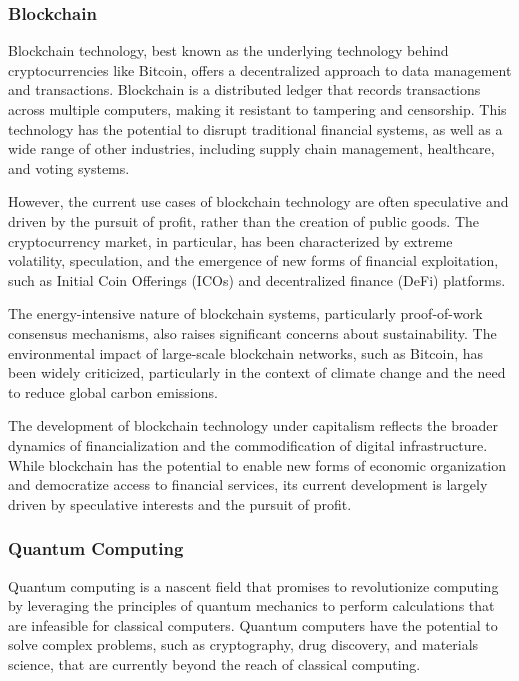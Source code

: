 \begin{refsection}
\begin{multicols}{2}
{\subsubsection{Blockchain}

Blockchain technology, best known as the underlying technology behind cryptocurrencies like Bitcoin, offers a decentralized approach to data management and transactions. Blockchain is a distributed ledger that records transactions across multiple computers, making it resistant to tampering and censorship. This technology has the potential to disrupt traditional financial systems, as well as a wide range of other industries, including supply chain management, healthcare, and voting systems.

However, the current use cases of blockchain technology are often speculative and driven by the pursuit of profit, rather than the creation of public goods. The cryptocurrency market, in particular, has been characterized by extreme volatility, speculation, and the emergence of new forms of financial exploitation, such as Initial Coin Offerings (ICOs) and decentralized finance (DeFi) platforms.

The energy-intensive nature of blockchain systems, particularly proof-of-work consensus mechanisms, also raises significant concerns about sustainability. The environmental impact of large-scale blockchain networks, such as Bitcoin, has been widely criticized, particularly in the context of climate change and the need to reduce global carbon emissions.

The development of blockchain technology under capitalism reflects the broader dynamics of financialization and the commodification of digital infrastructure. While blockchain has the potential to enable new forms of economic organization and democratize access to financial services, its current development is largely driven by speculative interests and the pursuit of profit.

\subsubsection{Quantum Computing}

Quantum computing is a nascent field that promises to revolutionize computing by leveraging the principles of quantum mechanics to perform calculations that are infeasible for classical computers. Quantum computers have the potential to solve complex problems, such as cryptography, drug discovery, and materials science, that are currently beyond the reach of classical computing.

}
\end{multicols}
\end{refsection}

